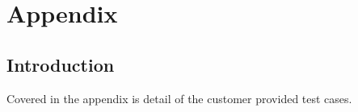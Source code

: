 
\chapter{Appendix}

\section{Introduction}
Covered in the appendix is detail of the customer provided test
cases.





